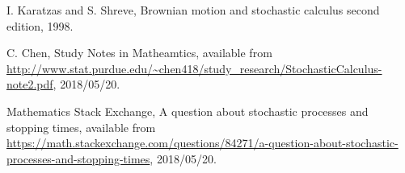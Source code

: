 \begin{thebibliography}{数字}
	 I. Karatzas and S. Shreve, Brownian motion and stochastic calculus second edition, 1998.
	
	 C. Chen, Study Notes in Matheamtics, available from \url{http://www.stat.purdue.edu/~chen418/study_research/StochasticCalculus-note2.pdf}, 2018/05/20.

	 Mathematics Stack Exchange, A question about stochastic processes and stopping times, available from \url{https://math.stackexchange.com/questions/84271/a-question-about-stochastic-processes-and-stopping-times}, 2018/05/20.

\end{thebibliography}